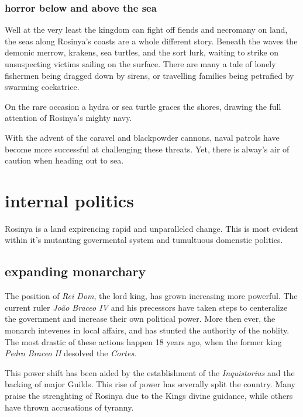 \documentclass[../main.tex]{subfiles}
\begin{document}
\subsubsection{horror below and above the sea}
Well at the very least the kingdom can fight off fiends and necromany on land, the 
seas along Rosinya's coasts are a whole different story. Beneath the waves the 
demonic merrow, krakens, sea turtles, and the sort lurk, waiting to strike on unsuspecting 
victims sailing on the surface. There are many a tale of lonely fishermen being
dragged down by sirens, or travelling families being petrafied by swarming cockatrice.

On the rare occasion a hydra or sea turtle graces the shores, drawing the full
attention of Rosinya's mighty navy. 

With the advent of the caravel and blackpowder cannons, naval patrols have become more 
successful at challenging these threats. Yet, there is alway's air of caution 
when heading out to sea.


\section{internal politics}
Rosinya is a land expirencing rapid and unparalleled change. This is most evident within
it's mutanting govermental system and tumultuous domenstic politics.

\subsection{expanding monarchary}
The position of \emph{Rei Dom}, the lord king, has grown increasing more powerful. 
The current ruler \emph{João Braceo IV} and his precessors have taken steps to
centeralize the government and increase their own political power. More then ever, 
the monarch intevenes in local affairs, and has stunted the authority of the noblity.
The most drastic of these actions happen 18 years ago, when the former king \emph{Pedro Braceo II}
desolved the \emph{Cortes}.

This power shift has been aided by the establishment of the \emph{Inquistorius} and the 
backing of major Guilds. This rise of power has severally split the country. Many praise the 
strenghting of Rosinya due to the Kings divine guidance, while others have thrown 
accusations of tyranny.


\end{document}
